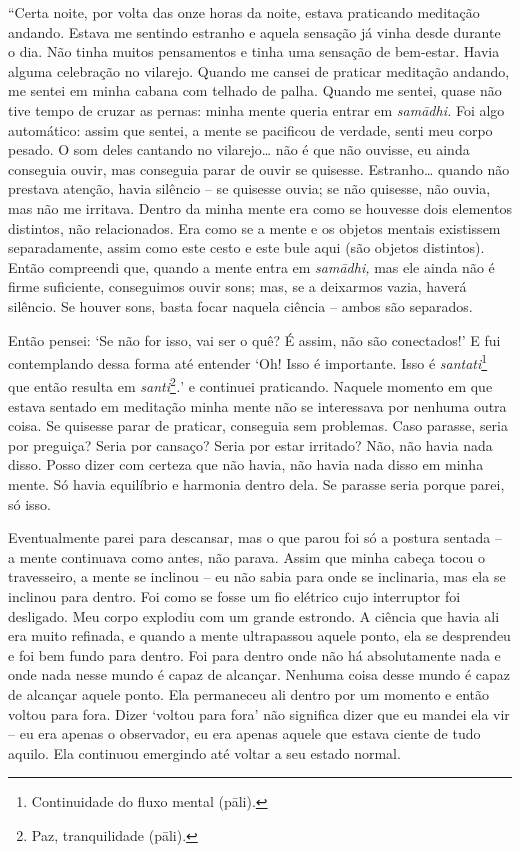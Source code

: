 ``Certa noite, por volta das onze horas da noite, estava praticando
meditação andando. Estava me sentindo estranho e aquela sensação já
vinha desde durante o dia. Não tinha muitos pensamentos e tinha uma
sensação de bem-estar. Havia alguma celebração no vilarejo. Quando me
cansei de praticar meditação andando, me sentei em minha cabana com
telhado de palha. Quando me sentei, quase não tive tempo de cruzar as
pernas: minha mente queria entrar em \emph{samādhi.} Foi algo
automático: assim que sentei, a mente se pacificou de verdade, senti meu
corpo pesado. O som deles cantando no vilarejo\ldots{} não é que não
ouvisse, eu ainda conseguia ouvir, mas conseguia parar de ouvir se
quisesse. Estranho\ldots{} quando não prestava atenção, havia silêncio
-- se quisesse ouvia; se não quisesse, não ouvia, mas não me irritava.
Dentro da minha mente era como se houvesse dois elementos distintos, não
relacionados. Era como se a mente e os objetos mentais existissem
separadamente, assim como este cesto e este bule aqui (são objetos
distintos). Então compreendi que, quando a mente entra em
\emph{samādhi,} mas ele ainda não é firme suficiente, conseguimos ouvir
sons; mas, se a deixarmos vazia, haverá silêncio. Se houver sons, basta
focar naquela ciência -- ambos são separados.

Então pensei: `Se não for isso, vai ser o quê? É assim, não são
conectados!' E fui contemplando dessa forma até entender `Oh! Isso é
importante. Isso é \emph{santati}\footnote{Continuidade do fluxo mental
  (pāli).} que então resulta em \emph{santi}\footnote{Paz, tranquilidade
  (pāli).}\emph{.}' e continuei praticando. Naquele momento em que
estava sentado em meditação minha mente não se interessava por nenhuma
outra coisa. Se quisesse parar de praticar, conseguia sem problemas.
Caso parasse, seria por preguiça? Seria por cansaço? Seria por estar
irritado? Não, não havia nada disso. Posso dizer com certeza que não
havia, não havia nada disso em minha mente. Só havia equilíbrio e
harmonia dentro dela. Se parasse seria porque parei, só isso.

Eventualmente parei para descansar, mas o que parou foi só a postura
sentada -- a mente continuava como antes, não parava. Assim que minha
cabeça tocou o travesseiro, a mente se inclinou -- eu não sabia para
onde se inclinaria, mas ela se inclinou para dentro. Foi como se fosse
um fio elétrico cujo interruptor foi desligado. Meu corpo explodiu com
um grande estrondo. A ciência que havia ali era muito refinada, e quando
a mente ultrapassou aquele ponto, ela se desprendeu e foi bem fundo para
dentro. Foi para dentro onde não há absolutamente nada e onde nada nesse
mundo é capaz de alcançar. Nenhuma coisa desse mundo é capaz de alcançar
aquele ponto. Ela permaneceu ali dentro por um momento e então voltou
para fora. Dizer `voltou para fora' não significa dizer que eu mandei
ela vir -- eu era apenas o observador, eu era apenas aquele que estava
ciente de tudo aquilo. Ela continuou emergindo até voltar a seu estado
normal.

